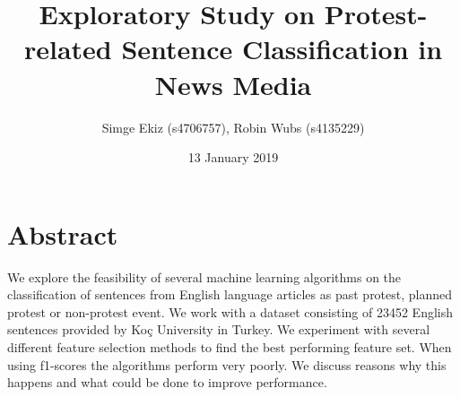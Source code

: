 \documentclass{article}
\title{Exploratory Study on Protest-related Sentence Classification in News Media}
\author{Simge Ekiz (s4706757), Robin Wubs (s4135229)}
\date{13 January 2019}
\begin{document}
\maketitle

 



 
 




\section{Abstract}
We explore the feasibility of several machine learning algorithms on the classification of sentences from English language articles as past protest, planned protest or non-protest event. We work with a dataset consisting of 23452 English sentences provided by Koç University in Turkey. We experiment with several different feature selection methods to find the best performing feature set. When using f1-scores the algorithms perform very poorly. We discuss reasons why this happens and what could be done to improve performance.
\end{document}
